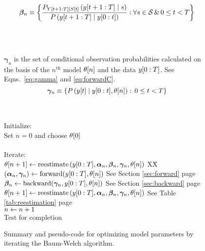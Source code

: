 \begin{figure}[htbp]
\begin{center}
{\begin{minipage}{0.90\textwidth}
\begin{tabbing}
\begin{minipage}[b]{1.0\textwidth}
\begin{equation*}
         \bm{\beta}_n \equiv \left\{ \frac{P_{\ts{Y}{t+1}{T}\given \ti{S}{t}}
         \left(\ts{y}{t+1}{T} \given  s \right)} {P
         \left(\ts{y}{t+1}{T}\given \ts{y}{0}{t} \right)} : \forall s \in
         \states\, \& \, 0 \leq t < T \right\}
         \end{equation*}
      \end{minipage}\\ \\%
      \begin{minipage}[b]{1.0\textwidth}
         $\bm{\gamma}_n$ is the set of conditional observation probabilities
         calculated on the basis of the $n^{\text{th}}$ model ${\theta}{[n]}$ and
         the data $y[0:T]$.  See Eqns.~\eqref{eq:gamma} and
         \eqref{eq:forwardC}.
         \begin{equation*}
         \bm{\gamma}_n \equiv \left\{P \left({y}{[t]} \mid  y[0:t],
         {\theta}{[n]}\right) : \, 0 \leq t < T \right\}
         \end{equation*}
      \end{minipage}\\ \\%
      \<\-
      Initialize: \> \+ \\
      Set $n=0$ and choose ${\theta}{[0]}$\\ \\ \< \-
      Iterate: \> \+ \\
      ${\theta}{[n+1]} \leftarrow \text{reestimate} \left( y[0:T],
      \bm{\alpha}_n, \bm{\beta}_n, \bm{\gamma}_n, {\theta}{[n]}\right)$ XX\= \kill
      $\left(\bm{\alpha}_n,\bm{\gamma}_n\right) \leftarrow
      \text{forward}(y[0:T],{\theta}{[n]})$ \> See Section
      \ref{sec:forward} page \pageref{sec:forward}\\
      $\bm{\beta}_n \leftarrow \text{backward}(\bm{\gamma}_n, y[0:T],
      {\theta}{[n]})$ \> See Section \ref{sec:backward}  page \pageref{sec:backward}\\
      ${\theta}{[n+1]} \leftarrow \text{reestimate} \left( y[0:T],
      \bm{\alpha}_n, \bm{\beta}_n, \bm{\gamma}_n, {\theta}{[n]}\right)$ \> See Table
      \ref{tab:reestimation} page \pageref{tab:reestimation} \\
      $n \leftarrow n+1$ \\
      Test for completion
    \end{tabbing}
  \end{minipage}
}
\caption[Baum-Welch model parameter optimization.]%
{Summary and pseudo-code for optimizing model parameters by iterating
  the Baum-Welch algorithm. }
    \label{fig:train}
  \end{center}
\end{figure}

